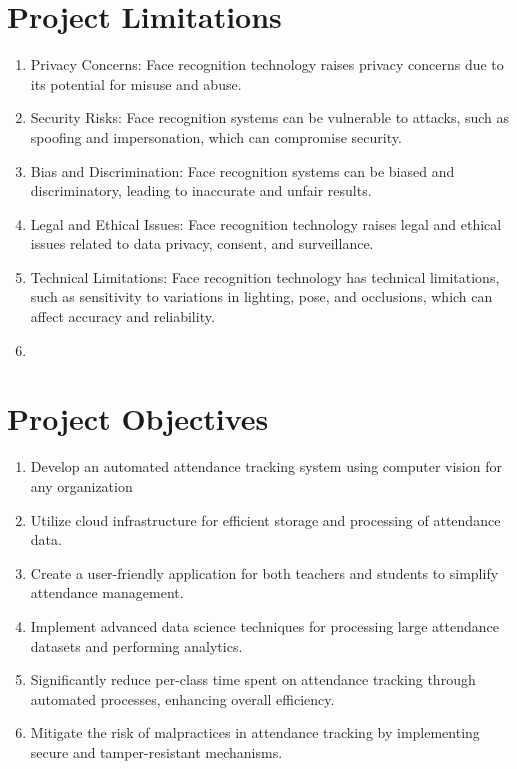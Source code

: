 \documentclass[openany]{report}
\begin{document}
\section{Project Limitations}

\begin{enumerate}
    \item Privacy Concerns: Face recognition technology raises privacy concerns due to its potential for misuse and abuse.
    \item Security Risks: Face recognition systems can be vulnerable to attacks, such as spoofing and impersonation, which can compromise security.
    \item Bias and Discrimination: Face recognition systems can be biased and discriminatory, leading to inaccurate and unfair results.
    \item Legal and Ethical Issues: Face recognition technology raises legal and ethical issues related to data privacy, consent, and surveillance.
    \item Technical Limitations: Face recognition technology has technical limitations, such as sensitivity to variations in lighting, pose, and occlusions, which can affect accuracy and reliability.\item
\end{enumerate}
\section{Project Objectives}

\begin{enumerate}
    \item Develop an automated attendance tracking system using computer vision for any organization
    \item Utilize cloud infrastructure for efficient storage and processing of attendance data.
    \item Create a user-friendly application for both teachers and students to simplify attendance management.
    \item Implement advanced data science techniques for processing large attendance datasets and performing analytics.
    \item Significantly reduce per-class time spent on attendance tracking through automated processes, enhancing overall efficiency.
    \item Mitigate the risk of malpractices in attendance tracking by implementing secure and tamper-resistant mechanisms.
\end{enumerate}
\end{document}
